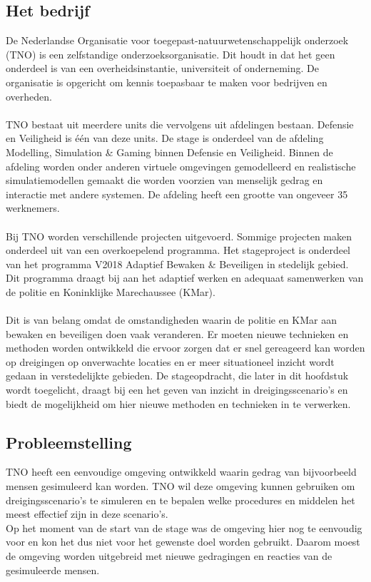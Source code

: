 \documentclass[12pt, letterpaper]{article}
\begin{document}
\subsection{Het bedrijf} 
De Nederlandse Organisatie voor toegepast-natuurwetenschappelijk onderzoek (TNO) is een zelfstandige onderzoeksorganisatie. Dit houdt in dat het geen onderdeel is van een overheidsinstantie, universiteit of onderneming. De organisatie is opgericht om kennis toepasbaar te maken voor bedrijven en overheden. 
\\ \\
TNO bestaat uit meerdere units die vervolgens uit afdelingen bestaan. Defensie en Veiligheid is één van deze units. De stage is onderdeel van de afdeling Modelling, Simulation \& Gaming binnen Defensie en Veiligheid. Binnen de afdeling worden onder anderen virtuele omgevingen gemodelleerd en realistische simulatiemodellen gemaakt die worden voorzien van menselijk gedrag en interactie met andere systemen. De afdeling heeft een grootte van ongeveer 35 werknemers.
\\ \\
Bij TNO worden verschillende projecten uitgevoerd. Sommige projecten maken onderdeel uit van een overkoepelend programma. Het stageproject is onderdeel van het programma V2018 Adaptief Bewaken \& Beveiligen in stedelijk gebied. Dit programma draagt bij aan het adaptief werken en adequaat samenwerken van de politie en Koninklijke Marechaussee (KMar).
\\ \\
Dit is van belang omdat de omstandigheden waarin de politie en KMar aan bewaken en beveiligen doen vaak veranderen.  Er moeten nieuwe technieken en methoden worden ontwikkeld die ervoor zorgen dat er snel gereageerd kan worden op dreigingen op onverwachte locaties en er meer situationeel inzicht wordt gedaan in verstedelijkte gebieden. De stageopdracht, die later in dit hoofdstuk wordt toegelicht, draagt bij een het geven van inzicht in dreigingsscenario's en biedt de mogelijkheid om hier nieuwe methoden en technieken in te verwerken.

\subsection{Probleemstelling}
TNO heeft een eenvoudige omgeving ontwikkeld waarin gedrag van bijvoorbeeld mensen gesimuleerd kan worden. TNO wil deze omgeving kunnen gebruiken om dreigingsscenario's te simuleren en te bepalen welke procedures en middelen het meest effectief zijn in deze scenario's.\\
Op het moment van de start van de stage was de omgeving hier nog te eenvoudig voor en kon het dus niet voor het gewenste doel worden gebruikt. Daarom moest de omgeving worden uitgebreid met nieuwe gedragingen en reacties van de gesimuleerde mensen. 
\end{document}
